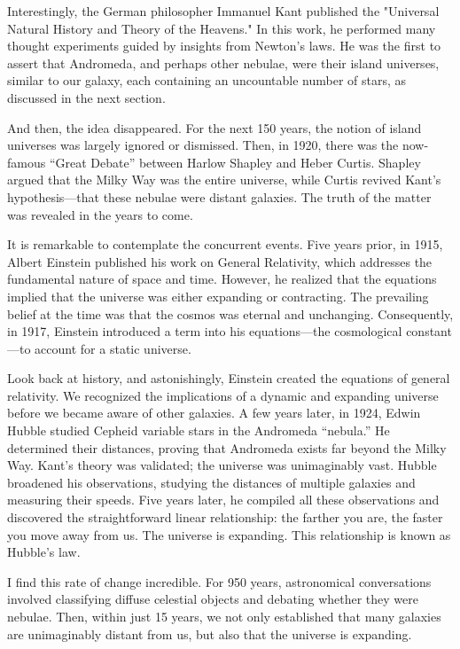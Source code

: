 Interestingly, the German philosopher Immanuel Kant published the "Universal Natural History and Theory of the Heavens." In this work, he performed many thought experiments guided by insights from Newton's laws. He was the first to assert that Andromeda, and perhaps other nebulae, were their island universes, similar to our galaxy, each containing an uncountable number of stars, as discussed in the next section.

And then, the idea disappeared. For the next 150 years, the notion of island universes was largely ignored or dismissed. Then, in 1920, there was the now-famous “Great Debate” between Harlow Shapley and Heber Curtis. Shapley argued that the Milky Way was the entire universe, while Curtis revived Kant's hypothesis—that these nebulae were distant galaxies. The truth of the matter was revealed in the years to come. 

It is remarkable to contemplate the concurrent events. Five years prior, in 1915, Albert Einstein published his work on General Relativity, which addresses the fundamental nature of space and time. However, he realized that the equations implied that the universe was either expanding or contracting. The prevailing belief at the time was that the cosmos was eternal and unchanging. Consequently, in 1917, Einstein introduced a term into his equations—the cosmological constant—to account for a static universe.

Look back at history, and astonishingly, Einstein created the equations of general relativity. We recognized the implications of a dynamic and expanding universe before we became aware of other galaxies. A few years later, in 1924, Edwin Hubble studied Cepheid variable stars in the Andromeda “nebula.” He determined their distances, proving that Andromeda exists far beyond the Milky Way. Kant's theory was validated; the universe was unimaginably vast. Hubble broadened his observations, studying the distances of multiple galaxies and measuring their speeds. Five years later, he compiled all these observations and discovered the straightforward linear relationship: the farther you are, the faster you move away from us. The universe is expanding. This relationship is known as Hubble's law.  

I find this rate of change incredible. For 950 years, astronomical conversations involved classifying diffuse celestial objects and debating whether they were nebulae. Then, within just 15 years, we not only established that many galaxies are unimaginably distant from us, but also that the universe is expanding. 

